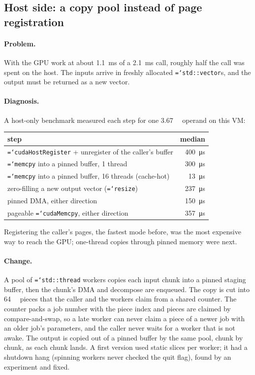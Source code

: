 \documentclass[11pt,a4paper]{article}
\newcommand{\code}[1]{\texttt{\hyphenchar\font=`\-\relax #1}}
\newcommand{\us}[1]{\SI{#1}{\micro\second}}
\newcommand{\ms}[1]{\SI{#1}{\milli\second}}
\newcommand{\MB}[1]{\SI{#1}{\mega\byte}}
\begin{document}
\subsection{Host side: a copy pool instead of page registration}

\paragraph{Problem.} With the GPU work at about \ms{1.1} of a \ms{2.1} call,
roughly half the call was spent on the host. The inputs arrive in freshly
allocated \code{std::vector}s, and the output must be returned as a new vector.

\paragraph{Diagnosis.} A host-only benchmark measured each step for one
\MB{3.67} operand on this VM:
\begin{center}
\begin{tabular}{lr}
\toprule
step & median \\
\midrule
\code{cudaHostRegister} + unregister of the caller's buffer & \us{400} \\
\code{memcpy} into a pinned buffer, 1 thread & \us{300} \\
\code{memcpy} into a pinned buffer, 16 threads (cache-hot) & \us{13} \\
zero-filling a new output vector (\code{resize}) & \us{237} \\
pinned DMA, either direction & \us{150} \\
pageable \code{cudaMemcpy}, either direction & \us{357} \\
\bottomrule
\end{tabular}
\end{center}
Registering the caller's pages, the fastest mode before, was the most expensive
way to reach the GPU; one-thread copies through pinned memory were next.

\paragraph{Change.} A pool of \code{std::thread} workers copies each input chunk into
a pinned staging buffer, then the chunk's DMA and decompose are enqueued. The copy
is cut into \SI{64}{\kilo\byte} pieces that the caller and the workers claim from a
shared counter. The counter packs a job number with the piece index and pieces are
claimed by compare-and-swap, so a late worker can never claim a piece of a newer
job with an older job's parameters, and the caller never waits for a worker that is
not awake. The output is copied out of a pinned buffer by the same pool, chunk by
chunk, as each chunk lands. A first version used static slices per worker; it had a
shutdown hang (spinning workers never checked the quit flag), found by an
experiment and fixed.
\end{document}
